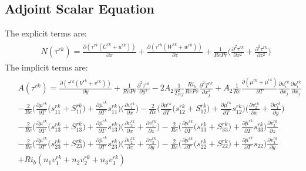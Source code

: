 \documentclass[preprint,12pt]{article}
\begin{document}
\subsection{Adjoint Scalar Equation}
The explicit terms are:
\begin{align}\begin{split}
&N(\tau^{rk})=\frac{\partial(\tau^{rk}(U^{rk}+u^{rk}))}{\partial x}+\frac{\partial(\tau^{rk}(W^{rk}+w^{rk}))}{\partial z}+\frac{1}{RePr}\Bigg(\frac{\partial^2\tau^{rk}}{\partial x^2}+\frac{\partial^2\tau^{rk}}{\partial z^2}\Bigg)
\end{split} \end{align}
The implicit terms are:
\begin{align}\begin{split}
&A(\tau^{rk})=\frac{\partial(\tau^{rk}(V^{rk}+v^{rk}))}{\partial y}+\frac{1}{RePr}\frac{\partial^2\tau^{rk}}{\partial y^2}-2A_2\frac{1}{T_{ref}^2}\frac{Ri_b}{Re Pr}\frac{\partial^2 T^{rk}}{\partial x_j^2}+A_2\frac{1}{Re}\frac{\partial (\mu^{rk}+\overline{\mu}^{rk})}{\partial T}\frac{\partial u_{i}^{rk}}{\partial x_j}\frac{\partial u_{i}^{rk}}{\partial x_j}\\&-\frac{2}{Re}\Big(\frac{\partial\mu^{rk}}{\partial T}\big(s_{11}^{rk}+S_{11}^{rk}\big)+\frac{\partial\bar{\mu}^{rk}}{\partial T}s_{11}^{rk}\Big)\Bigg(\frac{\partial v_1^{rk}}{\partial x}\Bigg)-\frac{2}{Re}\Big(\frac{\partial\mu^{rk}}{\partial T}\big(s_{12}^{rk}+S_{12}^{rk}\big)+\frac{\partial\bar{\mu}^{rk}}{\partial T}s_{12}^{rk}\Big)\Bigg(\frac{\partial v_2^{rk}}{\partial x}+\frac{\partial v_1^{rk}}{\partial y}\Bigg)\\&-\frac{2}{Re}\Big(\frac{\partial\mu^{rk}}{\partial T}\big(s_{13}^{rk}+S_{13}^{rk}\big)+\frac{\partial\bar{\mu}^{rk}}{\partial T}s_{13}^{rk}\Big)\Bigg(\frac{\partial v_3^{rk}}{\partial x}+\frac{\partial v_1^{rk}}{\partial z}\Bigg)-\frac{2}{Re}\Big(\frac{\partial\mu^{rk}}{\partial T}\big(s_{33}^{rk}+S_{33}^{rk}\big)+\frac{\partial\bar{\mu}^{rk}}{\partial T}s_{33}^{rk}\Big)\frac{\partial v_3^{rk}}{\partial z}\\&-\frac{2}{Re}\Big(\frac{\partial\mu^{rk}}{\partial T}\big(s_{23}^{rk}+S_{23}^{rk}\big)+\frac{\partial\bar{\mu}^{rk}}{\partial T}s_{23}^{rk}\Big)\Bigg(\frac{\partial v_2^{rk}}{\partial z}+\frac{\partial v_3^{rk}}{\partial y}\Bigg)-\frac{2}{Re}\Big(\frac{\partial\mu^{rk}}{\partial T}\big(s_{22}^{rk}+S_{22}^{rk}\big)+\frac{\partial\bar{\mu}^{rk}}{\partial T}s_{22}\Big)\frac{\partial v_2^{rk}}{\partial y}\\&+Ri_b(n_1v_1^{rk}+n_2v_2^{rk}+n_3v_3^{rk})
\end{split}
\end{align}
\end{document}
